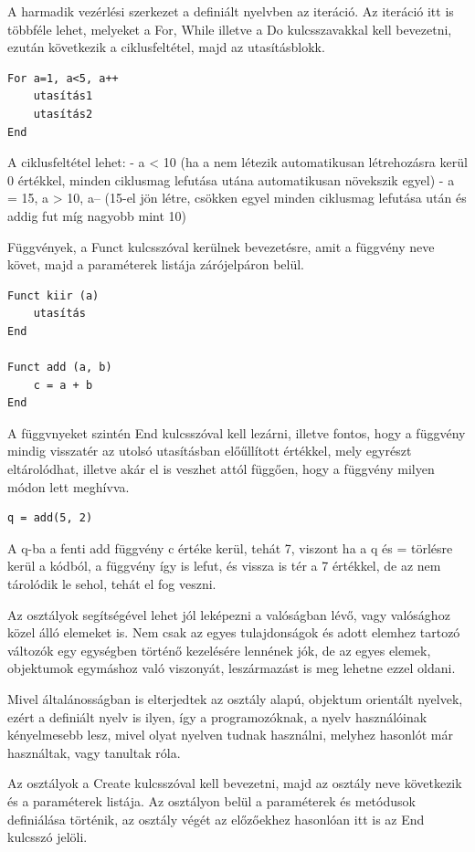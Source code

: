 A harmadik vezérlési szerkezet a definiált nyelvben az iteráció. Az iteráció itt is többféle lehet, melyeket a For, While illetve a Do kulcsszavakkal kell bevezetni, ezután következik a ciklusfeltétel, majd az utasításblokk.

\begin{verbatim}
For a=1, a<5, a++
	utasítás1
	utasítás2
End
\end{verbatim}

A ciklusfeltétel lehet:
- a < 10 (ha a nem létezik automatikusan létrehozásra kerül 0 értékkel, minden ciklusmag lefutása utána automatikusan növekszik egyel)
- a = 15, a > 10, a-- (15-el jön létre, csökken egyel minden ciklusmag lefutása után és addig fut míg nagyobb mint 10)

Függvények, a Funct kulcsszóval kerülnek bevezetésre, amit a függvény neve követ, majd a paraméterek listája zárójelpáron belül.

\begin{verbatim}
Funct kiir (a)
	utasítás
End

Funct add (a, b)
	c = a + b
End
\end{verbatim}

A függvnyeket szintén End kulcsszóval kell lezárni, illetve fontos, hogy a függvény mindig visszatér az utolsó utasításban előűllított értékkel, mely egyrészt eltárolódhat, illetve akár el is veszhet attól függően, hogy a függvény milyen módon lett meghívva.

\begin{verbatim}
q = add(5, 2)
\end{verbatim}

A q-ba a fenti add függvény c értéke kerül, tehát 7, viszont ha a q és = törlésre kerül a kódból, a függvény így is lefut, és vissza is tér a 7 értékkel, de az nem tárolódik le sehol, tehát el fog veszni.

Az osztályok segítségével lehet jól leképezni a valóságban lévő, vagy valósághoz közel álló elemeket is. Nem csak az egyes tulajdonságok és adott elemhez tartozó változók egy egységben történő kezelésére lennének jók, de az egyes elemek, objektumok egymáshoz való viszonyát, leszármazást is meg lehetne ezzel oldani.

Mivel általánosságban is elterjedtek az osztály alapú, objektum orientált nyelvek, ezért a definiált nyelv is ilyen, így a programozóknak, a nyelv használóinak kényelmesebb lesz, mivel olyat nyelven tudnak használni, melyhez hasonlót már használtak, vagy tanultak róla.

Az osztályok a Create kulcsszóval kell bevezetni, majd az osztály neve következik és a paraméterek listája. Az osztályon belül a paraméterek és metódusok definiálása történik, az osztály végét az előzőekhez hasonlóan itt is az End kulcsszó jelöli.

